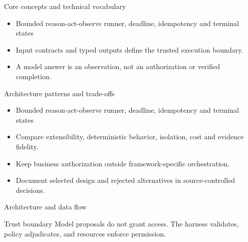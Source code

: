 \documentclass[aspectratio=169,10pt]{beamer}
\begin{document}
\begin{frame}{Core concepts and technical vocabulary}
\small
\begin{itemize}
\item Bounded reason-act-observe runner, deadline, idempotency and terminal states
\item Input contracts and typed outputs define the trusted execution boundary.
\item A model answer is an observation, not an authorization or verified completion.
\end{itemize}

\end{frame}

\begin{frame}{Architecture patterns and trade-offs}
\small
\begin{itemize}
\item Bounded reason-act-observe runner, deadline, idempotency and terminal states
\item Compare extensibility, deterministic behavior, isolation, cost and evidence fidelity.
\item Keep business authorization outside framework-specific orchestration.
\item Document selected design and rejected alternatives in source-controlled decisions.
\end{itemize}

\end{frame}

\begin{frame}{Architecture and data flow}
\small
\centering
{}
\vspace{0.6cm}
\begin{block}{Trust boundary}
Model proposals do not grant access. The harness validates, policy adjudicates, and resources enforce permission.
\end{block}
\end{frame}
\end{document}
